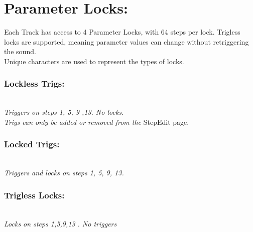 \chapter{Parameter Locks:}
Each Track has access to 4 Parameter Locks, with 64 steps per lock.
Trigless locks are supported, meaning parameter values can change without retriggering the sound. \\Unique characters are used to represent the  types of locks.
\subsection{Lockless Trigs:}
\\
\textit{Triggers on steps 1, 5, 9 ,13. No locks.\\
Trigs can only be added or removed from the} StepEdit page.\\
\subsection{Locked Trigs:}
\\
\textit{Triggers and locks on steps 1, 5, 9, 13.\\}
\subsection{Trigless Locks:}
\\
\textit{Locks on steps 1,5,9,13 . No triggers}
